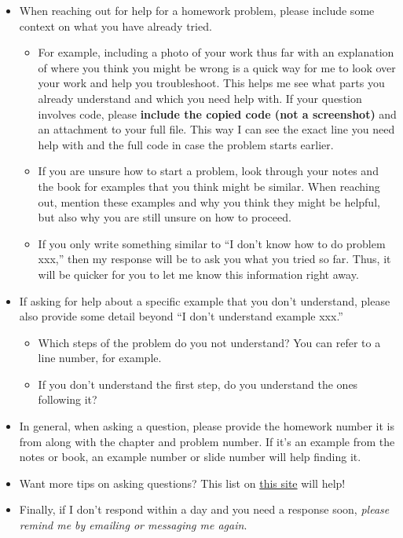 \documentclass[
  letterpaper,
  DIV=11,
  numbers=noendperiod]{scrartcl}
\providecommand{\tightlist}{%
  \setlength{\itemsep}{0pt}\setlength{\parskip}{0pt}}\usepackage{longtable,booktabs,array}
\begin{document}
\begin{itemize}
\tightlist
\item
  When reaching out for help for a homework problem, please include some
  context on what you have already tried.

  \begin{itemize}
  \tightlist
  \item
    For example, including a photo of your work thus far with an
    explanation of where you think you might be wrong is a quick way for
    me to look over your work and help you troubleshoot. This helps me
    see what parts you already understand and which you need help with.
    If your question involves code, please \textbf{include the copied
    code (not a screenshot)} and an attachment to your full file. This
    way I can see the exact line you need help with and the full code in
    case the problem starts earlier.
  \item
    If you are unsure how to start a problem, look through your notes
    and the book for examples that you think might be similar. When
    reaching out, mention these examples and why you think they might be
    helpful, but also why you are still unsure on how to proceed.
  \item
    If you only write something similar to ``I don't know how to do
    problem xxx,'' then my response will be to ask you what you tried so
    far. Thus, it will be quicker for you to let me know this
    information right away.
  \end{itemize}
\item
  If asking for help about a specific example that you don't understand,
  please also provide some detail beyond ``I don't understand example
  xxx.''

  \begin{itemize}
  \tightlist
  \item
    Which steps of the problem do you not understand? You can refer to a
    line number, for example.
  \item
    If you don't understand the first step, do you understand the ones
    following it?
  \end{itemize}
\item
  In general, when asking a question, please provide the homework number
  it is from along with the chapter and problem number. If it's an
  example from the notes or book, an example number or slide number will
  help finding it.
\item
  Want more tips on asking questions? This list on
  \href{https://www.weareteachers.com/8-ways-to-pose-better-questions-in-math-class/}{this
  site} will help!
\item
  Finally, if I don't respond within a day and you need a response soon,
  \emph{please remind me by emailing or messaging me again}.
\end{itemize}
\end{document}
